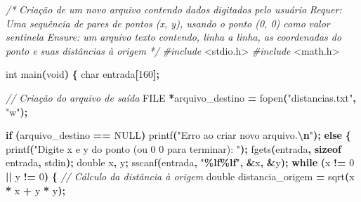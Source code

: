 \documentclass[
  11pt,
  a4paper,
]{scrbook}
\newenvironment{Shaded}{\begin{snugshade}}{\end{snugshade}}
\newcommand{\CommentTok}[1]{\textcolor[rgb]{0.56,0.35,0.01}{\textit{#1}}}
\newcommand{\ControlFlowTok}[1]{\textcolor[rgb]{0.13,0.29,0.53}{\textbf{#1}}}
\newcommand{\DataTypeTok}[1]{\textcolor[rgb]{0.13,0.29,0.53}{#1}}
\newcommand{\DecValTok}[1]{\textcolor[rgb]{0.00,0.00,0.81}{#1}}
\newcommand{\ImportTok}[1]{#1}
\newcommand{\KeywordTok}[1]{\textcolor[rgb]{0.13,0.29,0.53}{\textbf{#1}}}
\newcommand{\NormalTok}[1]{#1}
\newcommand{\OperatorTok}[1]{\textcolor[rgb]{0.81,0.36,0.00}{\textbf{#1}}}
\newcommand{\PreprocessorTok}[1]{\textcolor[rgb]{0.56,0.35,0.01}{\textit{#1}}}
\newcommand{\SpecialCharTok}[1]{\textcolor[rgb]{0.81,0.36,0.00}{\textbf{#1}}}
\newcommand{\StringTok}[1]{\textcolor[rgb]{0.31,0.60,0.02}{#1}}
\begin{document}
\begin{Shaded}
\begin{Highlighting}[numbers=left,,]
\CommentTok{/*}
\CommentTok{Criação de um novo arquivo contendo dados digitados pelo usuário}
\CommentTok{Requer: Uma sequência de pares de pontos (x, y), usando o ponto (0, 0) como}
\CommentTok{    valor sentinela}
\CommentTok{Ensure: um arquivo texto contendo, linha a linha, as coordenadas do ponto e}
\CommentTok{    suas distâncias à origem}
\CommentTok{*/}
\PreprocessorTok{\#include }\ImportTok{\textless{}stdio.h\textgreater{}}
\PreprocessorTok{\#include }\ImportTok{\textless{}math.h\textgreater{}}

\DataTypeTok{int}\NormalTok{ main}\OperatorTok{(}\DataTypeTok{void}\OperatorTok{)} \OperatorTok{\{}
    \DataTypeTok{char}\NormalTok{ entrada}\OperatorTok{[}\DecValTok{160}\OperatorTok{];}

    \CommentTok{// Criação do arquivo de saída}
    \DataTypeTok{FILE} \OperatorTok{*}\NormalTok{arquivo\_destino }\OperatorTok{=}\NormalTok{ fopen}\OperatorTok{(}\StringTok{"distancias.txt"}\OperatorTok{,} \StringTok{"w"}\OperatorTok{);}

    \ControlFlowTok{if} \OperatorTok{(}\NormalTok{arquivo\_destino }\OperatorTok{==}\NormalTok{ NULL}\OperatorTok{)}
\NormalTok{        printf}\OperatorTok{(}\StringTok{"Erro ao criar novo arquivo.}\SpecialCharTok{\textbackslash{}n}\StringTok{"}\OperatorTok{);}
    \ControlFlowTok{else} \OperatorTok{\{}
\NormalTok{        printf}\OperatorTok{(}\StringTok{"Digite x e y do ponto (ou 0 0  para terminar): "}\OperatorTok{);}
\NormalTok{        fgets}\OperatorTok{(}\NormalTok{entrada}\OperatorTok{,} \KeywordTok{sizeof}\NormalTok{ entrada}\OperatorTok{,}\NormalTok{ stdin}\OperatorTok{);}
        \DataTypeTok{double}\NormalTok{ x}\OperatorTok{,}\NormalTok{ y}\OperatorTok{;}
\NormalTok{        sscanf}\OperatorTok{(}\NormalTok{entrada}\OperatorTok{,} \StringTok{"}\SpecialCharTok{\%lf\%lf}\StringTok{"}\OperatorTok{,} \OperatorTok{\&}\NormalTok{x}\OperatorTok{,} \OperatorTok{\&}\NormalTok{y}\OperatorTok{);}
        \ControlFlowTok{while} \OperatorTok{(}\NormalTok{x }\OperatorTok{!=} \DecValTok{0} \OperatorTok{||}\NormalTok{ y }\OperatorTok{!=} \DecValTok{0}\OperatorTok{)} \OperatorTok{\{}
            \CommentTok{// Cálculo da distância à origem}
            \DataTypeTok{double}\NormalTok{ distancia\_origem }\OperatorTok{=}\NormalTok{ sqrt}\OperatorTok{(}\NormalTok{x }\OperatorTok{*}\NormalTok{ x }\OperatorTok{+}\NormalTok{ y }\OperatorTok{*}\NormalTok{ y}\OperatorTok{);}


\end{Highlighting}
\end{Shaded}
\end{document}
